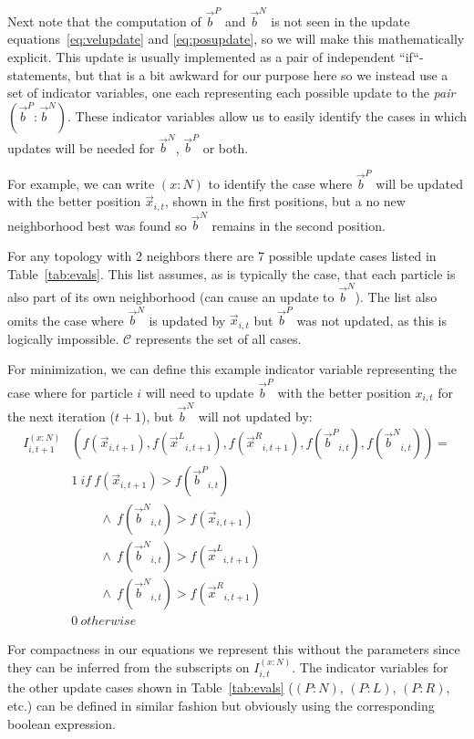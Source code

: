 \documentclass[journal,letterpaper]{IEEEtran}
\providecommand{\pers}{\ensuremath{P}}
\providecommand{\neigh}{\ensuremath{N}}
\providecommand{\leftind}{\ensuremath{L}}
\providecommand{\rightind}{\ensuremath{R}}
\providecommand{\ppos}{\ensuremath{\Vec{x}}}
\providecommand{\nbest}{\ensuremath{\Vec{b}^\neigh}}
\providecommand{\pbest}{\ensuremath{\Vec{b}^\pers}}
\providecommand{\ofunc}{\ensuremath{f}}
\providecommand{\indic}{\ensuremath{I}}
\providecommand{\leftn}{\ensuremath{\Vec{x}^\leftind}}
\providecommand{\rightn}{\ensuremath{\Vec{x}^\rightind}}
\providecommand{\caseset}{\ensuremath{\mathcal{C}}}
\providecommand{\casedef}{\ensuremath{(\pbest:\nbest)}}
\providecommand{\casexn}{\ensuremath{(x:\neigh)}}
\providecommand{\casepn}{\ensuremath{(\pers:\neigh)}}
\providecommand{\casepl}{\ensuremath{(\pers:\leftind)}}
\providecommand{\casepr}{\ensuremath{(\pers:\rightind)}}
\begin{document}
Next note that the computation of $\pbest$ and $\nbest$ is not seen in the
update equations~\eqref{eq:velupdate} and \eqref{eq:posupdate}, so we will make
this mathematically explicit.  This update is usually implemented as a pair of
independent ``if``-statements, but that is a bit awkward for our purpose here
so we instead use a set of indicator variables, one each representing each
possible update to the \emph{pair} $\casedef$.  These indicator variables allow
us to easily identify the cases in which updates will be needed for $\nbest$,
$\pbest$ or both.

For example, we can write $\casexn$ to identify the case where $\pbest$ will be
updated with the better position $\ppos_{i,t}$, shown in the first positions,
but a no new neighborhood best was found so $\nbest$ remains in the second
position.

For any topology with 2 neighbors there are 7 possible update cases listed in
Table~\ref{tab:evals}.  This list assumes, as is typically the case, that each
particle is also part of its own neighborhood (can cause an update to
$\nbest$). The list also omits the case where $\nbest$ is updated by
$\ppos_{i,t}$ but $\pbest$ was not updated, as this is logically impossible.
$\caseset$ represents the set of all cases.

For minimization, we can define this example indicator variable representing the case
where for particle $i$ will need to update $\pbest$ with the better
position $x_{i,t}$ for the next iteration ($t+1$), but $\nbest$ will not updated by:
\begin{align}
\nonumber
	\indic_{i,t+1}^{\casexn} & (\ofunc ( \ppos_{i,t+1} ) ,\ofunc(\leftn_{i,t+1}),\ofunc(\rightn_{i,t+1}) ,\ofunc(\pbest_{i,t}) ,\ofunc(\nbest_{i,t}))= \\
\nonumber
	& 1 \ if \  \ofunc(\ppos_{i,t+1}) > \ofunc(\pbest_{i,t}) \\
\nonumber
	& \quad \quad \ \wedge \ \ofunc(\nbest_{i,t}) > \ofunc(\ppos_{i,t+1}) \\
\nonumber
	& \quad \quad \ \wedge \ \ofunc(\nbest_{i,t}) > \ofunc(\leftn_{i,t+1}) \\
\nonumber
	& \quad \quad \ \wedge \ \ofunc(\nbest_{i,t}) > \ofunc(\rightn_{i,t+1}) \\
\label{eq:deficasexn}
	& 0 \ otherwise
\end{align}

For compactness in our equations we represent this without the parameters since
they can be inferred from the subscripts on $\indic_{i,t}^{\casexn}$.  The
indicator variables for the other update cases shown in Table~\ref{tab:evals}
($\casepn$, $\casepl$, $\casepr$, etc.) can be defined in similar fashion but
obviously using the corresponding boolean expression.
\end{document}
